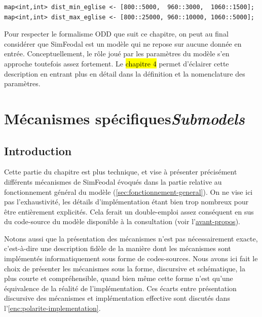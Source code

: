 {\footnotesize
\begin{lstlisting}[caption={
Deux exemples de \texttt{map} dans Gama.
\textit{À partir de 800, les églises doivent se situer entre 5 et 25~km, puis entre 3 et 10~km de 960 à 1060, et entre 1.5 et 5~km après cette date.}}, captionpos=b, label={lst:maps-gama}]
map<int,int> dist_min_eglise <- [800::5000,  960::3000,  1060::1500];
map<int,int> dist_max_eglise <- [800::25000, 960::10000, 1060::5000]; 
\end{lstlisting}
}

Pour respecter le formalisme ODD que suit ce chapitre, on peut au final considérer que SimFeodal est un modèle qui ne repose sur aucune donnée en entrée.
Conceptuellement, le rôle joué par les paramètres du modèle s'en approche toutefois assez fortement.
Le \hl{chapitre 4} permet d'éclairer cette description en entrant plus en détail dans la définition et la nomenclature des paramètres.

\let\orisectionmark\sectionmark
\renewcommand\sectionmark[1]{}%
\section[Mécanismes spécifiques -- \textit{Submodels}]{Mécanismes spécifiques\protect\newline \large{\textit{Submodels}}\label{sec:meca-specifiques}}
\orisectionmark{Mécanismes spécifiques}
\let\sectionmark\orisectionmark


\subsection{Introduction}

Cette partie du chapitre est plus technique, et vise à présenter précisément différents mécanismes de SimFeodal évoqués dans la partie relative au fonctionnement général du modèle (\cref{sec:fonctionnement-general}).
On ne vise ici pas l'exhaustivité, les détails d'implémentation étant bien trop nombreux pour être entièrement explicités.
Cela ferait un double-emploi assez conséquent en sus du code-source du modèle disponible à la consultation (voir l'\hyperlink{avant-propos}{avant-propos}).

Notons aussi que la présentation des mécanismes n'est pas nécessairement exacte, c'est-à-dire une description fidèle de la manière dont les mécanismes sont implémentés informatiquement sous forme de codes-sources.
Nous avons ici fait le choix de présenter les mécanismes sous la forme, discursive et schématique, la plus courte et compréhensible, quand bien même cette forme n'est qu'une \og équivalence\fg{} de la réalité de l'implémentation.
Ces écarts entre présentation discursive des mécanismes et implémentation effective sont discutés dans l'\cref{enc:polarite-implementation}.

